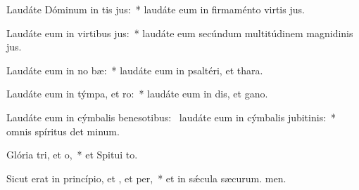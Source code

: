 \item Laudáte Dóminum in tis jus:~* laudáte eum in firmaménto virtis jus.
\item Laudáte eum in virtibus jus:~* laudáte eum secúndum multitúdinem magnidinis jus.
\item Laudáte eum in no bæ:~* laudáte eum in psaltéri, et thara.
\item Laudáte eum in týmpa, et ro:~* laudáte eum in dis, et gano.
\item Laudáte eum in cýmbalis benesotibus:~\pscross{} laudáte eum in cýmbalis jubitinis:~* omnis spíritus det minum.
\item Glória tri, et o,~* et Spitui to.
\item Sicut erat in princípio, et , et per,~* et in sǽcula sæcurum. men.
